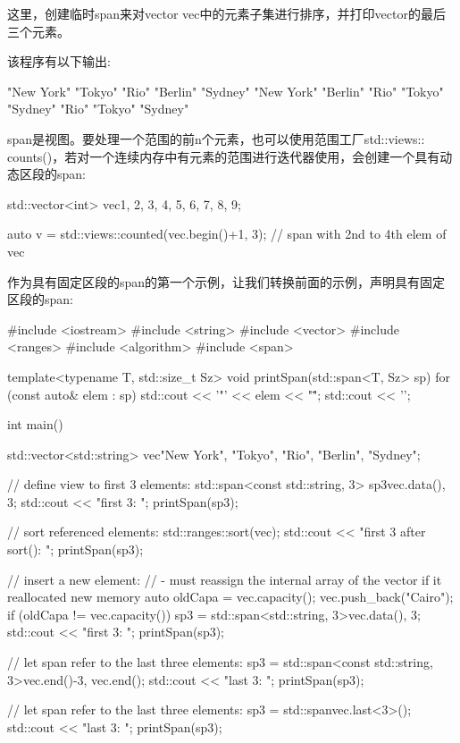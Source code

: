 这里，创建临时span来对vector vec中的元素子集进行排序，并打印vector的最后三个元素。

该程序有以下输出:

\begin{shell}
"New York" "Tokyo" "Rio" "Berlin" "Sydney"
"New York" "Berlin" "Rio" "Tokyo" "Sydney"
"Rio" "Tokyo" "Sydney"
\end{shell}

span是视图。要处理一个范围的前n个元素，也可以使用范围工厂std::views:: counts()，若对一个连续内存中有元素的范围进行迭代器使用，会创建一个具有动态区段的span:

\begin{cpp}
std::vector<int> vec{1, 2, 3, 4, 5, 6, 7, 8, 9};

auto v = std::views::counted(vec.begin()+1, 3); // span with 2nd to 4th elem of vec
\end{cpp}


作为具有固定区段的span的第一个示例，让我们转换前面的示例，声明具有固定区段的span:


\begin{cpp}
#include <iostream>
#include <string>
#include <vector>
#include <ranges>
#include <algorithm>
#include <span>

template<typename T, std::size_t Sz>
void printSpan(std::span<T, Sz> sp)
{
	for (const auto& elem : sp) {
		std::cout << '"' << elem << "\" ";
	}
	std::cout << '\n';
}

int main()
{
	std::vector<std::string> vec{"New York", "Tokyo", "Rio", "Berlin", "Sydney"};
	
	// define view to first 3 elements:
	std::span<const std::string, 3> sp3{vec.data(), 3};
	std::cout << "first 3: ";
	printSpan(sp3);
	
	// sort referenced elements:
	std::ranges::sort(vec);
	std::cout << "first 3 after sort(): ";
	printSpan(sp3);
	
	// insert a new element:
	// - must reassign the internal array of the vector if it reallocated new memory
	auto oldCapa = vec.capacity();
	vec.push_back("Cairo");
	if (oldCapa != vec.capacity()) {
		sp3 = std::span<std::string, 3>{vec.data(), 3};
	}
	std::cout << "first 3: ";
	printSpan(sp3);
	
	// let span refer to the last three elements:
	sp3 = std::span<const std::string, 3>{vec.end()-3, vec.end()};
	std::cout << "last 3: ";
	printSpan(sp3);
	
	// let span refer to the last three elements:
	sp3 = std::span{vec}.last<3>();
	std::cout << "last 3: ";
	printSpan(sp3);
}
\end{cpp}

